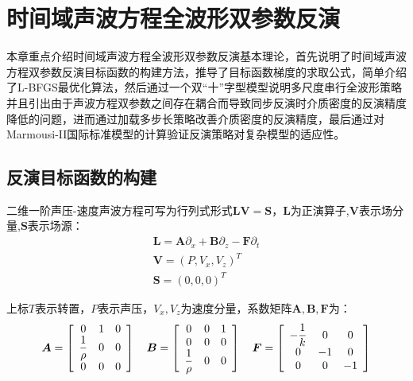 \documentclass[12pt]{article}
\begin{document}
\section{时间域声波方程全波形双参数反演}
本章重点介绍时间域声波方程全波形双参数反演基本理论，首先说明了时间域声波方程双参数反演目标函数的构建方法，推导了目标函数梯度的求取公式，简单介绍了L-BFGS最优化算法，然后通过一个双“十”字型模型说明多尺度串行全波形策略并且引出由于声波方程双参数之间存在耦合而导致同步反演时介质密度的反演精度降低的问题，进而通过加载多步长策略改善介质密度的反演精度，最后通过对Marmousi-II国际标准模型的计算验证反演策略对复杂模型的适应性。
\subsection{反演目标函数的构建}
二维一阶声压-速度声波方程可写为行列式形式$\boldsymbol{LV=S}$，$\boldsymbol{L}$为正演算子,$\boldsymbol{V}$表示场分量,$\boldsymbol{S}$表示场源：
\begin{equation}\label{3-1}
\begin{split}
\boldsymbol{L}=\boldsymbol{A}\partial_x+\boldsymbol{B}\partial_z-\boldsymbol{F}\partial_t \\
\boldsymbol{V}=(P,V_x,V_z)^T \\
\boldsymbol{S}=(0,0,0)^T
\end{split}
\end{equation}
\par
上标$T$表示转置，$P$表示声压，$V_x,V_z$为速度分量，系数矩阵$\boldsymbol{A},\boldsymbol{B},\boldsymbol{F}$为：
\begin{equation}\label{3-2}
\boldsymbol{A}=
\left[
\begin{array}{>{\displaystyle}c>{\displaystyle}c>{\displaystyle}c}
0 & 1 & 0\\
\frac{1}{\rho} & 0 & 0\\
0 & 0 & 0 	  
\end{array}
\right] \quad
\boldsymbol{B}=
\left[
\begin{array}{>{\displaystyle}c>{\displaystyle}c>{\displaystyle}c}
0 & 0 & 1\\ 
0 & 0 & 0\\
\frac{1}{\rho} & 0 & 0 	  
\end{array}
\right] \quad
\boldsymbol{F}=
\left[
\begin{array}{>{\displaystyle}c>{\displaystyle}c>{\displaystyle}c}
-\frac{1}{k} & 0 & 0\\ 
0 & -1 & 0\\
0 & 0 & -1 	  
\end{array}
\right] 
\end{equation}
\end{document}
